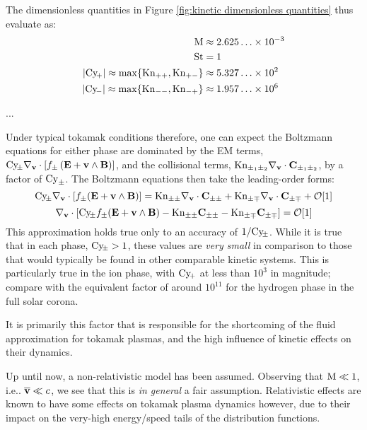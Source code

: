     The dimensionless quantities in Figure \ref{fig:kinetic dimensionless quantities} thus evaluate as:
    \begin{align}
                                                           \mathrm{M}  &\approx  2.625\ldots\times 10^{- 3}  \\
                                                          \mathrm{St}  &=        1                           \\
        |\mathrm{Cy}\!_{+}|  \approx  \max\{\mathrm{Kn}_{++},  \mathrm{Kn}_{+-}\}  &\approx  5.327\ldots\times 10^{2}    \\
        |\mathrm{Cy}\!_{-}|  \approx  \max\{\mathrm{Kn}_{--},  \mathrm{Kn}_{-+}\}  &\approx  1.957\ldots\times 10^{6}
    \end{align}

    ...

    Under typical tokamak conditions therefore, one can expect the Boltzmann equations for either phase are dominated by the EM terms, $\mathrm{Cy}\!_{\pm}\nabla_{\mathbf{v}}\cdot[f_{\pm}\left(\mathbf{E} + \mathbf{v}\wedge\mathbf{B}\right)]$, and the collisional terms, $\mathrm{Kn}_{\pm_{1}\pm_{2}}\nabla_{\mathbf{v}}\cdot\mathbf{C}_{\pm_{1}\pm_{2}}$, by a factor of $\mathrm{Cy}_{\pm}$. The Boltzmann equations then take the leading-order forms:
    \begin{equation}
        \mathrm{Cy}\!_{\pm}\nabla_{\mathbf{v}}\cdot[f_{\pm}(\mathbf{E} + \mathbf{v}\wedge\mathbf{B})]  =  \mathrm{Kn}_{\pm\pm}\nabla_{\mathbf{v}}\cdot\mathbf{C}_{\pm\pm} + \mathrm{Kn}_{\pm\mp}\nabla_{\mathbf{v}}\cdot\mathbf{C}_{\pm\mp} + \mathcal{O}[1]
    \end{equation}
    \begin{equation}
        \nabla_{\mathbf{v}}\cdot[\mathrm{Cy}\!_{\pm}f_{\pm}(\mathbf{E} + \mathbf{v}\wedge\mathbf{B}) - \mathrm{Kn}_{\pm\pm}\mathbf{C}_{\pm\pm} - \mathrm{Kn}_{\pm\mp}\mathbf{C}_{\pm\mp}]  =  \mathcal{O}[1]  \label{eqn:leading-order Boltzmann equation}
    \end{equation}
    This approximation holds true only to an accuracy of $1/\mathrm{Cy}\!_{\pm}$. While it is true that in each phase, $\mathrm{Cy}\!_{\pm} > 1$, these values are \emph{very small} in comparison to those that would typically be found in other comparable kinetic systems. This is particularly true in the ion phase, with $\mathrm{Cy}\!_{+}$ at less than $10^{3}$ in magnitude; compare with the equivalent factor of around $10^{11}$ for the hydrogen phase in the full solar corona.

    It is primarily this factor that is responsible for the shortcoming of the fluid approximation for tokamak plasmas, and the high influence of kinetic effects on their dynamics.

    \begin{remark}
        Up until now, a non-relativistic model has been assumed. Observing that $\mathrm{M}  \ll  1$, i.e.. $\overline{\mathbf{v}}  \ll  c$, we see that this is \emph{in general} a fair assumption. Relativistic effects are known to have some effects on tokamak plasma dynamics however, due to their impact on the very-high energy/speed tails of the distribution functions. \BA{[Ref]}
    \end{remark}
    